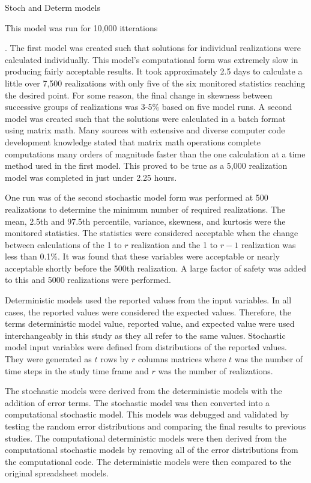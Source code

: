 Stoch and Determ models

This model was run for 10,000 itterations

.  The first model was created such that solutions for individual realizations were calculated individually.  This model's computational form was extremely slow in producing fairly acceptable results.  It took approximately 2.5 days to calculate a little over 7,500 realizations with only five of the six monitored statistics reaching the desired point.  For some reason, the final change in skewness between successive groups of realizations was 3-5\% based on five model runs.  A second model was created such that the solutions were calculated in a batch format using matrix math.  Many sources with extensive and diverse computer code development knowledge stated that matrix math operations complete computations many orders of magnitude faster than the one calculation at a time method used in the first model.  This proved to be true as a 5,000 realization model was completed in just under 2.25 hours.

One run was of the second stochastic model form was performed at 500 realizations to determine the minimum number of required realizations.  The mean, 2.5th and 97.5th percentile, variance, skewness, and kurtosis were the monitored statistics.  The statistics were considered acceptable when the change between calculations of the 1 to $r$ realization and the 1 to $r-1$ realization was less than 0.1\%.  It was found that these variables were acceptable or nearly acceptable shortly before the 500th realization.  A large factor of safety was added to this and 5000 realizations were performed.

Deterministic models used the reported values from the input variables.  In all cases, the reported values were considered the expected values.  Therefore, the terms deterministic model value, reported value, and expected value were used interchangeably in this study as they all refer to the same values.  Stochastic model input variables were defined from distributions of the reported values.  They were generated as $t$ rows by $r$ columns matrices where $t$ was the number of time steps in the study time frame and $r$ was the number of realizations.

The stochastic models were derived from the deterministic models with the addition of error terms.  The stochastic model was then converted into a computational stochastic model.  This models was debugged and validated by testing the random error distributions and comparing the final results to previous studies.  The computational deterministic models were then derived from the computational stochastic models by removing all of the error distributions from the computational code.  The deterministic models were then compared to the original spreadsheet models.